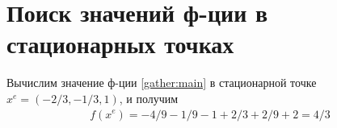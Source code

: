 \section{Поиск значений ф-ции в стационарных точках}
    Вычислим значение ф-ции \ref{gather:main} в стационарной точке $x^e=(-2/3,-1/3,1)$, и получим
    \begin{gather}
        f(x^e) = -4/9 - 1/9 - 1 + 2/3 + 2/9 + 2 = 4/3
    \end{gather}
    
    